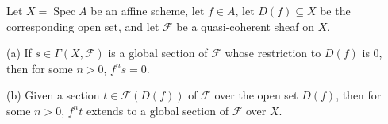 Let $X = \operatorname{Spec} A$ be an affine scheme, let $f \in A$, let $D(f) \subseteq X$ be the corresponding open set, and let $\mathcal{F}$ be a quasi-coherent sheaf on $X$.

(a) If $s \in \Gamma(X, \mathcal{F})$ is a global section of $\mathcal{F}$ whose restriction to $D(f)$ is $0$, then for some $n > 0$, $f^n s = 0$.

(b) Given a section $t \in \mathcal{F}(D(f))$ of $\mathcal{F}$ over the open set $D(f)$, then for some $n > 0$, $f^n t$ extends to a global section of $\mathcal{F}$ over $X$.
